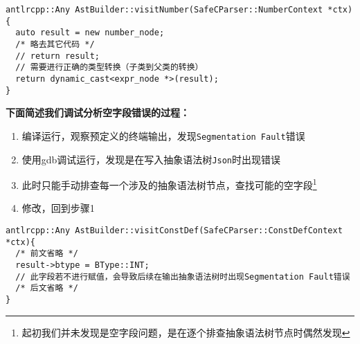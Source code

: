 \documentclass[../main.tex]{subfiles}
\begin{document}
\begin{mdframed}
  \begin{verbatim}
antlrcpp::Any AstBuilder::visitNumber(SafeCParser::NumberContext *ctx) {
  auto result = new number_node;
  /* 略去其它代码 */
  // return result;
  // 需要进行正确的类型转换（子类到父类的转换）
  return dynamic_cast<expr_node *>(result);
}
  \end{verbatim}
\end{mdframed}


\textbf{下面简述我们调试分析空字段错误的过程：}

\begin{enumerate}
	\item 编译运行，观察预定义的终端输出，发现\texttt{Segmentation Fault}错误
	\item 使用gdb调试运行，发现是在写入抽象语法树\texttt{Json}时出现错误
	\item 此时只能手动排查每一个涉及的抽象语法树节点，查找可能的空字段\footnote{起初我们并未发现是空字段问题，是在逐个排查抽象语法树节点时偶然发现}
	\item 修改，回到步骤1
\end{enumerate}

\begin{mdframed}
	\begin{verbatim}
antlrcpp::Any AstBuilder::visitConstDef(SafeCParser::ConstDefContext *ctx){
  /* 前文省略 */
  result->btype = BType::INT;
  // 此字段若不进行赋值，会导致后续在输出抽象语法树时出现Segmentation Fault错误
  /* 后文省略 */
}
  \end{verbatim}
\end{mdframed}
\end{document}
